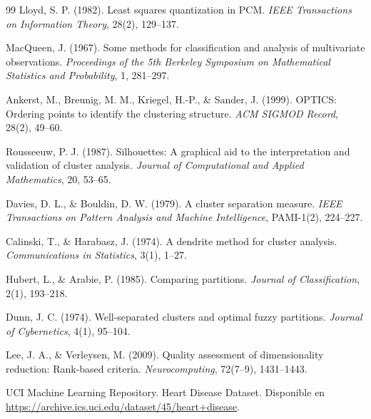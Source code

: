 \documentclass[11pt,a4paper]{article}
\begin{document}
\begin{thebibliography}{99}
Lloyd, S. P. (1982). Least squares quantization in PCM. \emph{IEEE Transactions on
Information Theory}, 28(2), 129--137.

MacQueen, J. (1967). Some methods for classification and analysis of multivariate
observations. \emph{Proceedings of the 5th Berkeley Symposium on Mathematical Statistics and
Probability}, 1, 281--297.

Ankerst, M., Breunig, M. M., Kriegel, H.-P., \& Sander, J. (1999). OPTICS: Ordering points
to identify the clustering structure. \emph{ACM SIGMOD Record}, 28(2), 49--60.

Rousseeuw, P. J. (1987). Silhouettes: A graphical aid to the interpretation and validation
of cluster analysis. \emph{Journal of Computational and Applied Mathematics}, 20, 53--65.

Davies, D. L., \& Bouldin, D. W. (1979). A cluster separation measure. \emph{IEEE
Transactions on Pattern Analysis and Machine Intelligence}, PAMI-1(2), 224--227.

Calinski, T., \& Harabasz, J. (1974). A dendrite method for cluster analysis.
\emph{Communications in Statistics}, 3(1), 1--27.

Hubert, L., \& Arabie, P. (1985). Comparing partitions. \emph{Journal of Classification},
2(1), 193--218.

Dunn, J. C. (1974). Well-separated clusters and optimal fuzzy partitions. \emph{Journal of
Cybernetics}, 4(1), 95--104.

Lee, J. A., \& Verleysen, M. (2009). Quality assessment of dimensionality reduction:
Rank-based criteria. \emph{Neurocomputing}, 72(7--9), 1431--1443.

UCI Machine Learning Repository. Heart Disease Dataset. Disponible en
\url{https://archive.ics.uci.edu/dataset/45/heart+disease}.

\end{thebibliography}
\end{document}
